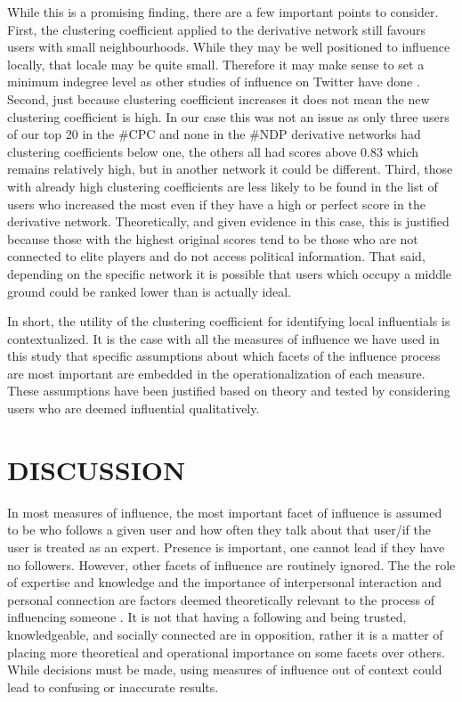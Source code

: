 \documentclass[a4paper,12pt]{article}
\begin{document}
While this is a promising finding, there are a few important points to consider. First, the clustering coefficient applied to the derivative network still favours users with small neighbourhoods. While they may be well positioned to influence locally, that locale may be quite small. Therefore it may make sense to set a minimum indegree level as other studies of influence on Twitter have done \cite{Cha}. Second, just because clustering coefficient increases it does not mean the new clustering coefficient is high. In our case this was not an issue as only three users of our top 20 in the \#CPC and none in the \#NDP derivative networks had clustering coefficients below one, the others all had scores above 0.83 which remains relatively high, but in another network it could be different. Third, those with already high clustering coefficients are less likely to be found in the list of users who increased the most even if they have a high or perfect score in the derivative network. Theoretically, and given evidence in this case, this is justified because those with the highest original scores tend to be those who are not connected to elite players and do not access political information. That said, depending on the specific network it is possible that users which occupy a middle ground could be ranked lower than is actually ideal.

In short, the utility of the clustering coefficient for identifying local influentials is contextualized. It is the case with all the measures of influence we have used in this study that specific assumptions about which facets of the influence process are most important are embedded in the operationalization of each measure. These assumptions have been justified based on theory and tested by considering users who are deemed influential qualitatively.

\section{DISCUSSION}

In most measures of influence, the most important facet of influence is assumed to be who follows a given user and how often they talk about that user/if the user is treated as an expert. Presence is important, one cannot lead if they have no followers. However, other facets of influence are routinely ignored. The the role of expertise and knowledge and the importance of interpersonal interaction and personal connection are factors deemed theoretically relevant to the process of influencing someone \cite{katzlazarsfeld}. It is not that having a following and being trusted, knowledgeable, and socially connected are in opposition, rather it is a matter of placing more theoretical and operational importance on some facets over others. While decisions must be made, using measures of influence out of context could lead to confusing or inaccurate results.
\end{document}
